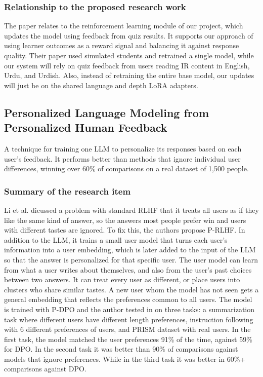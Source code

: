 \documentclass{FastFyp}
\begin{document}
\subsubsection{Relationship to the proposed research work}
The paper relates to the reinforcement learning module of our project, which updates the model using feedback from quiz results. It supports our approach of using learner outcomes as a reward signal and balancing it against response quality. Their paper used simulated students and retrained a single model, while our system will rely on quiz feedback from users reading IR content in English, Urdu, and Urdish. Also, instead of retraining the entire base model, our updates will just be on the shared language and depth LoRA adapters. 

\subsection{Personalized Language Modeling from Personalized Human Feedback}
A technique for training one LLM to personalize its responses based on each user's feedback. It performs better than methods that ignore individual user differences, winning over 60\% of comparisons on a real dataset of 1,500 people.

\subsubsection{Summary of the research item}
Li et al. \cite{li2024personalized} dicussed a problem with standard RLHF that it treats all users as if they like the same kind of answer, so the answers most people prefer win and users with different tastes are ignored. To fix this, the authors propose P-RLHF. In addition to the LLM, it trains a small user model that turns each user's information into a user embedding, which is later added to the input of the LLM so that the answer is personalized for that specific user. The user model can learn from what a user writes about themselves, and also from the user's past choices between two answers. It can treat every user as different, or place users into clusters who share similar tastes. A new user whom the model has not seen gets a general embedding that reflects the preferences common to all users. The model is trained with P-DPO and the author tested in on three tasks: a summarization task where different users have different length preferences, instruction following with 6 different preferences of users, and PRISM dataset with real users. In the first task, the model matched the user preferences 91\% of the time, against 59\% for DPO. In the second task it was better than 90\% of comparisons against models that ignore preferences. While in the third task it was better in 60\%+ comparisons against DPO.
\end{document}

